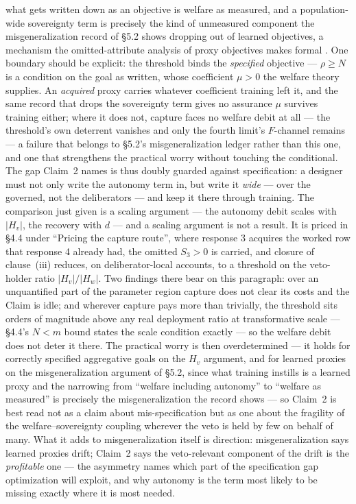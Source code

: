 \documentclass[11pt]{article}
\theoremstyle{definition}
\begin{document}
what gets written down as an objective is welfare as measured, and a population-wide sovereignty term is precisely the kind of unmeasured component the misgeneralization record of \S5.2 shows dropping out of learned objectives, a mechanism the omitted-attribute analysis of proxy objectives makes formal \cite{zhuang2020consequences}. One boundary should be explicit: the threshold binds the \emph{specified} objective --- $\rho \geq N$ is a condition on the goal as written, whose coefficient $\mu > 0$ the welfare theory supplies. An \emph{acquired} proxy carries whatever coefficient training left it, and the same record that drops the sovereignty term gives no assurance $\mu$ survives training either; where it does not, capture faces no welfare debit at all --- the threshold's own deterrent vanishes and only the fourth limit's $F$-channel remains --- a failure that belongs to \S5.2's misgeneralization ledger rather than this one, and one that strengthens the practical worry without touching the conditional. The gap Claim~2 names is thus doubly guarded against specification: a designer must not only write the autonomy term in, but write it \emph{wide} --- over the governed, not the deliberators --- and keep it there through training. The comparison just given is a scaling argument --- the autonomy debit scales with $|H_v|$, the recovery with $d$ --- and a scaling argument is not a result. It is priced in \S4.4 under ``Pricing the capture route'', where response 3 acquires the worked row that response 4 already had, the omitted $S_3 > 0$ is carried, and closure of clause~(iii) reduces, on deliberator-local accounts, to a threshold on the veto-holder ratio $|H_v|/|H_w|$. Two findings there bear on this paragraph: over an unquantified part of the parameter region capture does not clear its costs and the Claim is idle; and wherever capture pays more than trivially, the threshold sits orders of magnitude above any real deployment ratio at transformative scale --- \S4.4's $N < m$ bound states the scale condition exactly --- so the welfare debit does not deter it there. The practical worry is then overdetermined --- it holds for correctly specified aggregative goals on the $H_v$ argument, and for learned proxies on the misgeneralization argument of \S5.2, since what training instills is a learned proxy and the narrowing from ``welfare including autonomy'' to ``welfare as measured'' is precisely the misgeneralization the record shows \cite{christiano2017preferences,casper2023open} --- so Claim~2 is best read not as a claim about mis-specification but as one about the fragility of the welfare--sovereignty coupling wherever the veto is held by few on behalf of many. What it adds to misgeneralization itself is direction: misgeneralization says learned proxies drift; Claim~2 says the veto-relevant component of the drift is the \emph{profitable} one --- the asymmetry names which part of the specification gap optimization will exploit, and why autonomy is the term most likely to be missing exactly where it is most needed.
\end{document}
